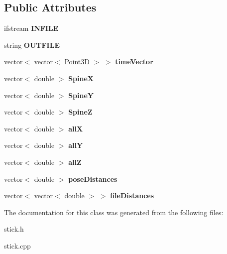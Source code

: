 \subsection*{Public Attributes}
\begin{DoxyCompactItemize}
\item 
\hypertarget{classstick_ac63fffacc7eca04c88b885d3a35e75e0}{}ifstream {\bfseries I\+N\+F\+I\+L\+E}\label{classstick_ac63fffacc7eca04c88b885d3a35e75e0}

\item 
\hypertarget{classstick_aa85ca609d82212de522701d6a8e67d6d}{}string {\bfseries O\+U\+T\+F\+I\+L\+E}\label{classstick_aa85ca609d82212de522701d6a8e67d6d}

\item 
\hypertarget{classstick_a8f0922e786ba884110fcc76dc90c6c2d}{}vector$<$ vector$<$ \hyperlink{classPoint3D}{Point3\+D} $>$ $>$ {\bfseries time\+Vector}\label{classstick_a8f0922e786ba884110fcc76dc90c6c2d}

\item 
\hypertarget{classstick_aef26c60512969883cf900cc6055a3920}{}vector$<$ double $>$ {\bfseries Spine\+X}\label{classstick_aef26c60512969883cf900cc6055a3920}

\item 
\hypertarget{classstick_af631827c87f672d56fe5a5b8c498e838}{}vector$<$ double $>$ {\bfseries Spine\+Y}\label{classstick_af631827c87f672d56fe5a5b8c498e838}

\item 
\hypertarget{classstick_a00de5edeb9a5c6ff6ebf4e722042fb28}{}vector$<$ double $>$ {\bfseries Spine\+Z}\label{classstick_a00de5edeb9a5c6ff6ebf4e722042fb28}

\item 
\hypertarget{classstick_a987aa56e0fc324f7457fcf417749a19b}{}vector$<$ double $>$ {\bfseries all\+X}\label{classstick_a987aa56e0fc324f7457fcf417749a19b}

\item 
\hypertarget{classstick_a42d1dc7f285557231220b51bff2cad6e}{}vector$<$ double $>$ {\bfseries all\+Y}\label{classstick_a42d1dc7f285557231220b51bff2cad6e}

\item 
\hypertarget{classstick_a5c0bf59422d789f495dfc676205b07e7}{}vector$<$ double $>$ {\bfseries all\+Z}\label{classstick_a5c0bf59422d789f495dfc676205b07e7}

\item 
\hypertarget{classstick_addbaf22838da67255aa700634c0659a1}{}vector$<$ double $>$ {\bfseries pose\+Distances}\label{classstick_addbaf22838da67255aa700634c0659a1}

\item 
\hypertarget{classstick_adab6d1317b8799745d8ce06919144ceb}{}vector$<$ vector$<$ double $>$ $>$ {\bfseries file\+Distances}\label{classstick_adab6d1317b8799745d8ce06919144ceb}

\end{DoxyCompactItemize}


The documentation for this class was generated from the following files\+:\begin{DoxyCompactItemize}
\item 
stick.\+h\item 
stick.\+cpp\end{DoxyCompactItemize}
